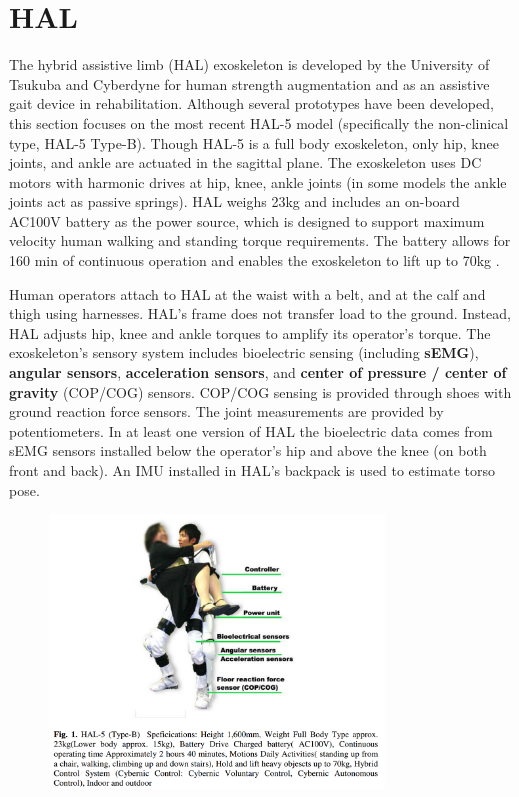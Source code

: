 \section{HAL}
\label{exo:hal}
\begin{refsection}


The hybrid assistive limb (HAL) exoskeleton is developed by the University of Tsukuba and Cyberdyne for human strength augmentation and as an assistive gait device in rehabilitation.  Although several prototypes have been developed, this section focuses on the most recent HAL-5 model (specifically the non-clinical type, HAL-5 Type-B). Though HAL-5 is a full body exoskeleton, only hip, knee joints, and ankle are actuated in the sagittal plane.  The exoskeleton uses DC motors with harmonic drives at hip, knee, ankle joints (in some models the ankle joints act as passive springs).  HAL weighs 23kg and includes an on-board AC100V battery as the power source, which is designed to support maximum velocity human walking and standing torque requirements.  The battery allows for 160 min of continuous operation and enables the exoskeleton to lift up to 70kg \cite{HALassist2011}.  

Human operators attach to HAL at the waist with a belt, and at the calf and thigh using harnesses. HAL's frame does not transfer load to the ground.  Instead, HAL adjusts hip, knee and ankle torques to amplify its operator's torque. The exoskeleton's sensory system includes bioelectric sensing (including \textbf{sEMG}), \textbf{angular sensors}, \textbf{acceleration sensors}, and \textbf{center of pressure / center of gravity} (COP/COG) sensors.  COP/COG sensing is provided through shoes with ground reaction force sensors.  The joint measurements are provided by potentiometers.
In at least one version of HAL the bioelectric data comes from sEMG sensors installed below the operator's hip and above the knee (on both front and back).
An IMU installed in HAL's backpack is used to estimate torso pose.


\begin{figure}[ht]
  \centering
  \includegraphics[width=3.5in]{exos/figs/hal-5_B_diagram.png}
\end{figure}



\end{refsection}
